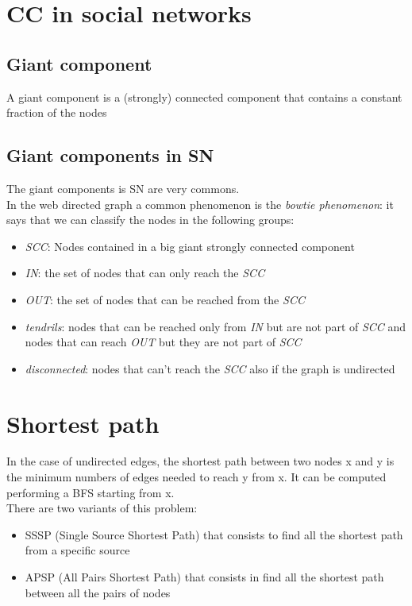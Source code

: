\documentclass[10pt,a4paper]{book}
\begin{document}
		 	\section{CC in social networks}
		 	\subsection{Giant component}
		 	A giant  component is a (strongly) connected component that contains a constant fraction of the nodes
		 	\subsection{Giant components in SN}
		 	The giant components is SN are very commons. \\
		 	In the web directed graph a common phenomenon is the \textit{bowtie phenomenon}: it says that we can classify the nodes in the following groups:
		 	\begin{itemize}
		 		\item \textit{SCC}: Nodes contained in a big giant strongly connected component
		 		\item \textit{IN}: the set of nodes that can only reach the \textit{SCC}
		 		\item \textit{OUT}: the set of nodes that can be reached from the \textit{SCC}
		 		\item \textit{tendrils}: nodes that can be reached only from \textit{IN} but are not part of \textit{SCC} and nodes that can reach \textit{OUT} but they are not part of \textit{SCC}
		 		\item \textit{disconnected}: nodes that can't reach the \textit{SCC} also if the graph is undirected
		 	\end{itemize}
		 	\section{Shortest path}
		 	In the case of undirected edges, the shortest path between two nodes x and y  is the minimum numbers of edges needed to reach y from x. It can be computed performing a BFS starting from x.\\
		 	There are two variants of this problem:
		 	\begin{itemize}
		 		\item SSSP (Single Source Shortest Path) that consists to find all the shortest path from a specific source
		 		\item APSP (All Pairs Shortest Path) that consists in find all the shortest path between all the pairs of nodes
		 	\end{itemize}
\end{document}
